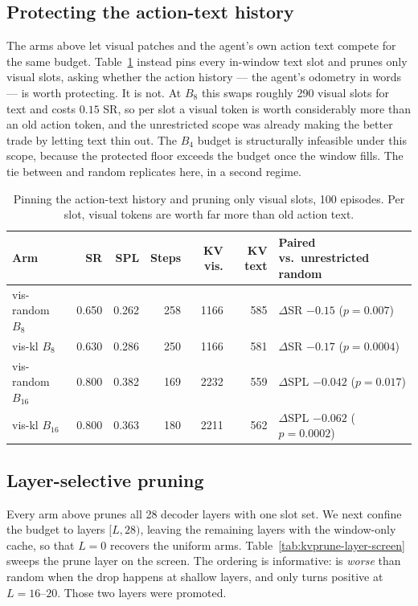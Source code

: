 \subsection{Protecting the action-text history}
\label{sec:kvprune-scope}

The arms above let visual patches and the agent's own action text compete for the same
budget. Table~\ref{tab:kvprune-scope} instead pins every in-window text slot and prunes only
visual slots, asking whether the action history --- the agent's odometry in words --- is
worth protecting. It is not. At $B_8$ this swaps roughly 290 visual slots for text and costs
$0.15$ SR, so per slot a visual token is worth considerably more than an old action token,
and the unrestricted scope was already making the better trade by letting text thin out.
The $B_4$ budget is structurally infeasible under this scope, because the protected floor
exceeds the budget once the window fills. The tie between  and random replicates
here, in a second regime.

\begin{table}[ht]
\centering
\begin{tabular}{lrrrrrl}
\toprule
Arm & SR & SPL & Steps & KV vis. & KV text & Paired vs.\ unrestricted random \\
\midrule
vis-random $B_8$    & 0.650 & 0.262 & 258 & 1166 & 585 & $\Delta$SR $-0.15$ ($p=0.007$) \\
vis-kl $B_8$        & 0.630 & 0.286 & 250 & 1166 & 581 & $\Delta$SR $-0.17$ ($p=0.0004$) \\
vis-random $B_{16}$ & 0.800 & 0.382 & 169 & 2232 & 559 & $\Delta$SPL $-0.042$ ($p=0.017$) \\
vis-kl $B_{16}$     & 0.800 & 0.363 & 180 & 2211 & 562 & $\Delta$SPL $-0.062$ ($p=0.0002$) \\
\bottomrule
\end{tabular}
\caption{Pinning the action-text history and pruning only visual slots, 100 episodes.
Per slot, visual tokens are worth far more than old action text.}
\label{tab:kvprune-scope}
\end{table}

\subsection{Layer-selective pruning}
\label{sec:kvprune-layers}

Every arm above prunes all 28 decoder layers with one slot set. We next confine the budget
to layers $[L, 28)$, leaving the remaining layers with the window-only cache, so that $L=0$
recovers the uniform arms. Table~\ref{tab:kvprune-layer-screen} sweeps the prune layer on the
screen. The ordering is informative:  is \emph{worse} than random when the drop
happens at shallow layers, and only turns positive at $L = 16$--$20$. Those two layers were
promoted.

